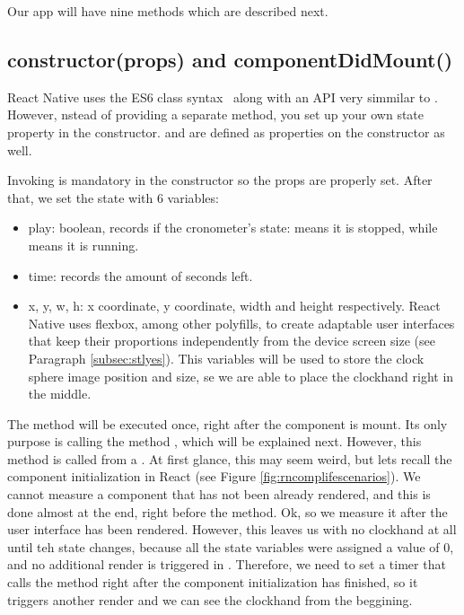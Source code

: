 \lstset{style=myhtml}


Our app will have nine methods which are described next.

\subsection{constructor(props) and componentDidMount()}

\lstset{style=myhtml}


React Native uses the ES6 class syntax~\cite{es6} along with an API very simmilar to . However, nstead of providing a separate  method, you set up your own state property in the constructor.  and  are defined as properties on the constructor as well. 

Invoking  is mandatory in the constructor so the props are properly set. After that, we set the state with 6 variables:

\begin{itemize}
 \item play: boolean, records if the cronometer's state:  means it is stopped, while  means it is running.
 \item time: records the amount of seconds left.
 \item x, y, w, h: x coordinate, y coordinate, width and height respectively. React Native uses flexbox, among other polyfills, to create adaptable user interfaces that keep their proportions independently from the device screen size (see Paragraph \ref{subsec:stlyes}). This variables will be used to store the clock sphere image position and size, se we are able to place the clockhand right in the middle.
\end{itemize}

The  method will be executed once, right after the component is mount. Its only purpose is calling the method , which will be explained next. However, this method is called from a . At first glance, this may seem weird, but lets recall the component initialization in React (see Figure \ref{fig:rncomplifescenarios}). We cannot measure a component that has not been already rendered, and this is done almost at the end, right before the  method. Ok, so we measure it after the user interface has been rendered. However, this leaves us with no clockhand at all until teh state changes, because all the state variables were assigned a value of 0, and no additional render is triggered in . Therefore, we need to set a timer that calls the  method right after the component initialization has finished, so it triggers another render and we can see the clockhand from the beggining.


